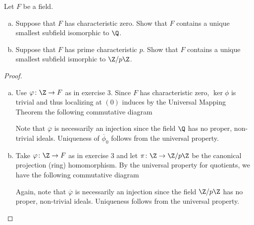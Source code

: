 \documentclass[10pt]{amsart}
\begin{document}
\begin{thm}
  Let $F$ be a field.
  \begin{enumerate}[(a)]
  \item
    Suppose that $F$ has characteristic zero.
    Show that $F$ contains a unique smallest subfield isomorphic to $\Q$.
  \item
    Suppose that $F$ has prime characteristic $p$.
    Show that $F$ contains a unique smallest subfield ismorphic to $\Z/p\Z$.
  \end{enumerate}
  \begin{proof}
    \begin{enumerate}[(a)]
    \item
      Use $\varphi \colon \Z \rightarrow F$ as in exercise 3.
      Since $F$ has characteristic zero, $\ker\phi$ is trivial and thus localizing at $(0)$ induces by the Universal Mapping Theorem the following commutative diagram\\
      \begin{center}
      \end{center}
      Note that $\overline{\varphi}$ is necessarily an injection since the field $\Q$ has no proper, non-trivial ideals.
      Uniqueness of $\overline{\phi}_0$ follows from the universal property.
    \item
      Take $\varphi \colon \Z \rightarrow F$ as in exercise 3 and let $\pi \colon \Z \rightarrow \Z/p\Z$ be the canonical projection (ring) homomorphism.
      By the universal property for quotients, we have the following commutative diagram\\
      \begin{center}
      \end{center}
      Again, note that $\overline{\varphi}$ is necessarily an injection since the field $\Z/p\Z$ has no proper, non-trivial ideals.
      Uniqueness follows from the universal property.
    \end{enumerate}
  \end{proof}
\end{thm}
\end{document}
